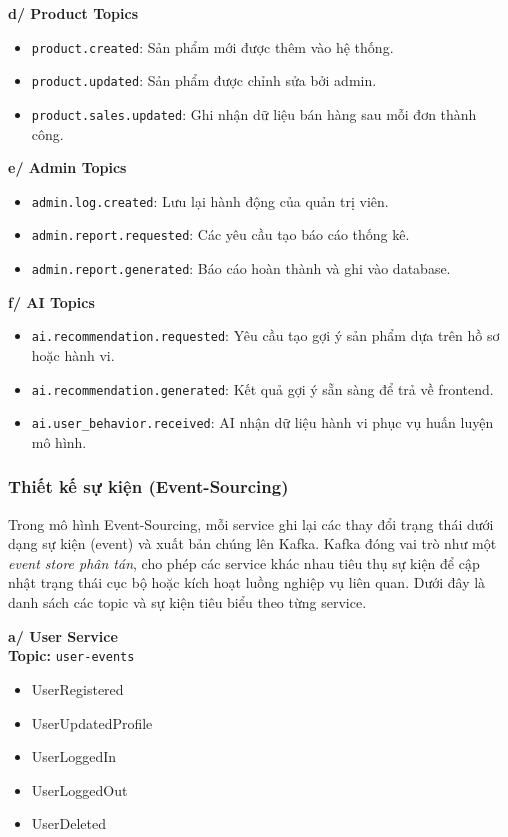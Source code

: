 \textbf{d/ Product Topics}
\begin{itemize}
    \item \texttt{product.created}: Sản phẩm mới được thêm vào hệ thống.
    \item \texttt{product.updated}: Sản phẩm được chỉnh sửa bởi admin.
    \item \texttt{product.sales.updated}: Ghi nhận dữ liệu bán hàng sau mỗi đơn thành công.
\end{itemize}

\textbf{e/ Admin Topics}
\begin{itemize}
    \item \texttt{admin.log.created}: Lưu lại hành động của quản trị viên.
    \item \texttt{admin.report.requested}: Các yêu cầu tạo báo cáo thống kê.
    \item \texttt{admin.report.generated}: Báo cáo hoàn thành và ghi vào database.
\end{itemize}

\textbf{f/ AI Topics}
\begin{itemize}
    \item \texttt{ai.recommendation.requested}: Yêu cầu tạo gợi ý sản phẩm dựa trên hồ sơ hoặc hành vi.
    \item \texttt{ai.recommendation.generated}: Kết quả gợi ý sẵn sàng để trả về frontend.
    \item \texttt{ai.user\_behavior.received}: AI nhận dữ liệu hành vi phục vụ huấn luyện mô hình.
\end{itemize}

\subsubsection{Thiết kế sự kiện (Event-Sourcing)}

Trong mô hình Event-Sourcing, mỗi service ghi lại các thay đổi trạng thái dưới dạng sự kiện (event) và xuất bản chúng lên Kafka. 
Kafka đóng vai trò như một \textit{event store phân tán}, cho phép các service khác nhau tiêu thụ sự kiện để cập nhật trạng thái cục bộ hoặc kích hoạt luồng nghiệp vụ liên quan. 
Dưới đây là danh sách các topic và sự kiện tiêu biểu theo từng service.

\vspace{0.5em}

\textbf{a/ User Service} \\
\textbf{Topic:} \texttt{user-events}
\begin{itemize}
    \item UserRegistered
    \item UserUpdatedProfile
    \item UserLoggedIn
    \item UserLoggedOut
    \item UserDeleted
\end{itemize}


